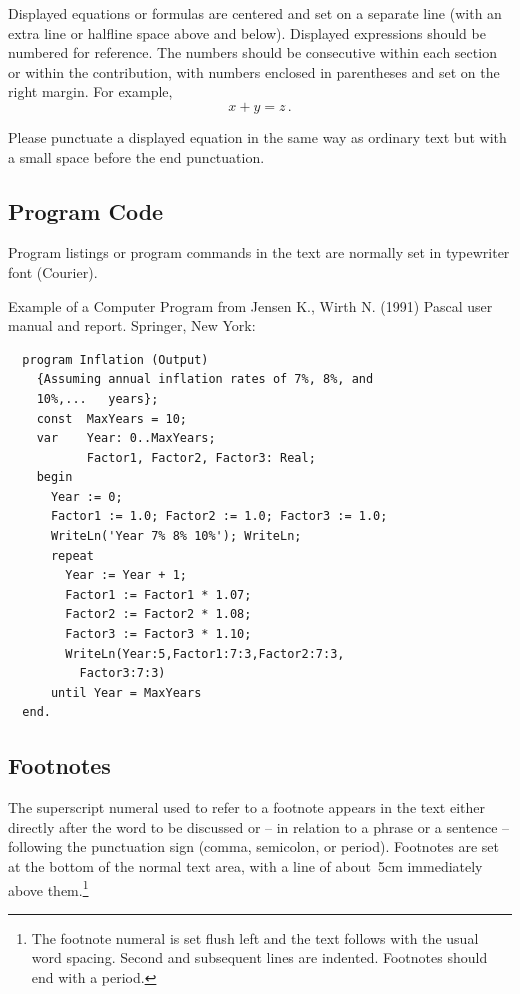 \documentclass[runningheads]{comsis2}
\begin{document}
Displayed equations or formulas are centered and set on a separate line (with
an extra line or halfline space above and below). Displayed expressions should
be numbered for reference. The numbers should be consecutive within each
section or within the contribution, with numbers enclosed in parentheses and
set on the right margin. For example,
\begin{equation}
x + y = z\,.
\end{equation}

Please punctuate a displayed equation in the same way as ordinary text but
with a small space before the end punctuation.

\subsection{Program Code}

Program listings or program commands in the text are normally set in
typewriter font (Courier).

Example of a Computer Program from Jensen K., Wirth N. (1991) Pascal user
manual and report. Springer, New York:

\begin{verbatim}
  program Inflation (Output)
    {Assuming annual inflation rates of 7%, 8%, and
    10%,...   years};
    const  MaxYears = 10;
    var    Year: 0..MaxYears;
           Factor1, Factor2, Factor3: Real;
    begin
      Year := 0;
      Factor1 := 1.0; Factor2 := 1.0; Factor3 := 1.0;
      WriteLn('Year 7% 8% 10%'); WriteLn;
      repeat
        Year := Year + 1;
        Factor1 := Factor1 * 1.07;
        Factor2 := Factor2 * 1.08;
        Factor3 := Factor3 * 1.10;
        WriteLn(Year:5,Factor1:7:3,Factor2:7:3,
          Factor3:7:3)
      until Year = MaxYears
  end.
\end{verbatim}

\subsection{Footnotes}

The superscript numeral used to refer to a footnote appears in the text either
directly after the word to be discussed or -- in relation to a phrase or a
sentence -- following the punctuation sign (comma, semicolon, or period).
Footnotes are set at the bottom of the normal text area, with a line of
about~5cm immediately above them.\footnote{The footnote numeral is set flush
left and the text follows with the usual word spacing. Second and subsequent
lines are indented. Footnotes should end with a period.}
\end{document}
